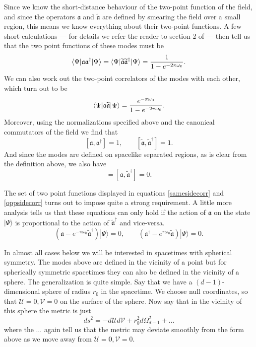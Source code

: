 \documentclass[12pt]{article}
\newcommand{\be}{\begin{equation}}
\newcommand{\ee}{\end{equation}}
\def \anh {\mathfrak{a}}
\def \tildanh {\widetilde{\mathfrak{a}}}
\def\uent{\mathcal{U}}
\def\vent{\mathcal{V}}
\begin{document}
Since we know the short-distance behaviour of the two-point function of the field, and since the operators $\anh$ and $\tildanh$ are defined by smearing the field over a small region, this means we know everything about their two-point functions. A few short calculations --- for details we refer the reader to section 2 of \cite{Papadodimas:2019msp}--- then tell us that the two point functions of these modes must be
\be
\label{samesidecorr}
\langle \Psi | \anh \anh^{\dagger} | \Psi \rangle = \langle \Psi | \tildanh \tildanh^{\dagger} | \Psi \rangle = {1 \over 1 - e^{-2 \pi \omega_0}}.
\ee
We can also work out the two-point correlators of the modes with each other, which turn out to be
\be
\label{oppsidecorr}
\langle \Psi | \anh \tildanh | \Psi \rangle = {e^{-\pi \omega_0}  \over 1 - e^{-2 \pi \omega_0}}.
\ee
Moreover, using the normalizations specified above and the canonical commutators of the field we find that
\be
\label{commutmodes}
[\anh, \anh^{\dagger}] = 1, \qquad
[\tildanh, \tildanh^{\dagger}] = 1.
\ee
And since the modes are defined on spacelike separated regions, as is clear from the definition above, we also have
\be
[\anh, \tildanh] =[\anh, \tildanh^{\dagger}] = 0.
\ee

The set of two point functions displayed in equations \eqref{samesidecorr} and \eqref{oppsidecorr} turns out to impose quite a strong requirement.  A little more analysis tells us that these equations can only hold if the action of $\anh$ on the state $|\Psi \rangle$ is proportional to the action of $\tildanh^{\dagger}$ and vice-versa.
\be
\label{stateaction}
(\anh - e^{-\pi \omega_0} \tildanh^{\dagger})|\Psi \rangle = 0, \qquad
(\anh^{\dagger} - e^{{\pi \omega_0}} \tildanh)  |\Psi \rangle = 0.
\ee


In almost all cases below we will be interested in spacetimes with spherical symmetry. The modes above are defined in the vicinity of a point but for spherically symmetric spacetimes they can also be defined in the vicinity of a sphere. The generalization is quite simple.
Say that we have a $(d-1)$-dimensional sphere of radius $r_0$ in the spacetime. We choose null coordinates, so that  $\uent=0, \vent = 0$ on the surface of the sphere.  Now say that in the vicinity of this sphere the metric is just
\be
\label{metricsphericalnull}
ds^2 = -d \uent d \vent + r_0^2 d \Omega_{d-1}^2 + \ldots
\ee
where the $\ldots$ again tell us that the metric may deviate smoothly from the form above as we move away from $\uent = 0, \vent = 0$.
\end{document}

